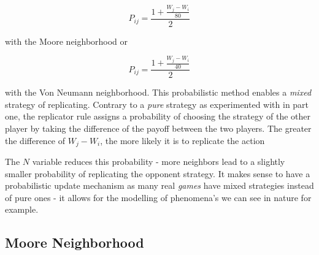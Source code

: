 \documentclass[a4paper, 11pt]{article}
\begin{document}
\[ P_{ij} = \frac{1+ \frac{W_j-W_i}{80}}{2} \]

with the Moore neighborhood or

\[ P_{ij} = \frac{1+ \frac{W_j-W_i}{40}}{2} \]

with the Von Neumann neighborhood. This probabilistic method enables a \textit{mixed} strategy of replicating. Contrary to a \textit{pure} strategy as experimented with in part one, the replicator rule assigns a probability of choosing the strategy of the other player by taking the difference of the payoff between the two players. The greater the difference of $W_j - W_i$, the more likely it is to replicate the action

The $N$ variable reduces this probability - more neighbors lead to a slightly smaller probability of replicating the opponent strategy. It makes sense to have a probabilistic update mechanism as many real \textit{games} have mixed strategies instead of pure ones - it allows for the modelling of phenomena’s we can see in nature for example.



\newpage

\subsection{Moore Neighborhood}
\end{document}
